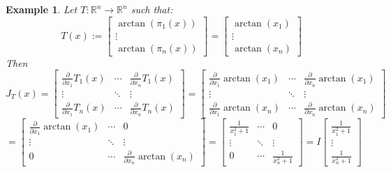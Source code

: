\documentclass[12pt]{extarticle}
\theoremstyle{plain}
\theoremstyle{Definition}
\theoremstyle{Definition}
\theoremstyle{plain}
\newtheorem{exmp}{Example}[section]
\begin{document}
\begin{exmp} 
	Let $T : \mathbb{R}^n \to \mathbb{R}^n$ such that:
	\[
	T(x) := 
	\begin{bmatrix}
	\arctan(\pi_1(x)) \\ 
	\vdots \\ 
	\arctan(\pi_n(x))
	\end{bmatrix}
	= 
	\begin{bmatrix}
	\arctan(x_1) \\ 
	\vdots \\ 
	\arctan(x_n)
	\end{bmatrix}
	\]
	Then
	\[
	J_T(x) = 
	\begin{bmatrix} 
	\frac{\partial }{\partial x_1}T_1(x) & \cdots & \frac{\partial }{\partial x_n}T_1(x) \\
	\vdots & \ddots & \vdots \\ 
	\frac{\partial }{\partial x_1}T_n(x) & \cdots & \frac{\partial }{\partial x_n}T_n(x) 
	\end{bmatrix}
	=
	\begin{bmatrix} 
	\frac{\partial}{\partial x_1}\arctan(x_1) & \cdots & \frac{\partial}{\partial x_n}\arctan(x_1) \\
	\vdots & \ddots & \vdots \\ 
	\frac{\partial }{\partial x_1}\arctan(x_n) & \cdots & \frac{\partial }{\partial x_n}\arctan(x_n) 
	\end{bmatrix}	
	\]
	\[
	=
	\begin{bmatrix} 
	\frac{\partial}{\partial x_1}\arctan(x_1) & \cdots & 0 \\
	\vdots & \ddots & \vdots \\ 
	0 & \cdots & \frac{\partial }{\partial x_n}\arctan(x_n) 
	\end{bmatrix}								
	=
	\begin{bmatrix} 
	\frac{1}{x_1^2 + 1} & \cdots & 0 \\
	\vdots & \ddots & \vdots \\ 
	0 & \cdots & \frac{1}{x_n^2 + 1} 
	\end{bmatrix}								
	= I \begin{bmatrix}
	\frac{1}{x_1^2 + 1} \\ 
	\vdots \\
	\frac{1}{x_n^2 + 1}
	\end{bmatrix}
	\]
\end{exmp}
\end{document}
